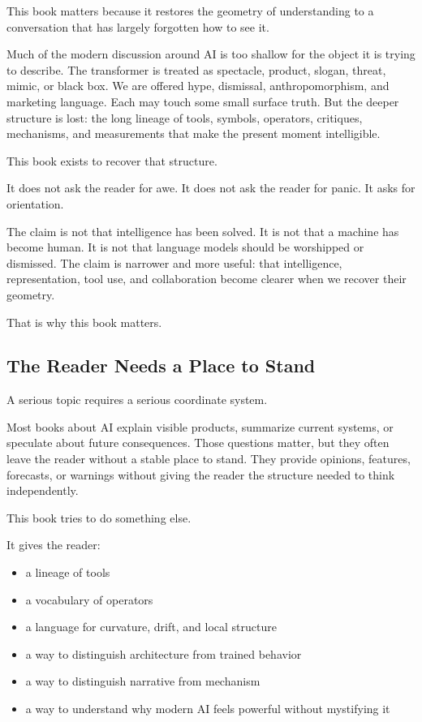 \documentclass[
]{article}
\providecommand{\tightlist}{%
  \setlength{\itemsep}{0pt}\setlength{\parskip}{0pt}}
\begin{document}
This book matters because it restores the geometry of understanding to a
conversation that has largely forgotten how to see it.

Much of the modern discussion around AI is too shallow for the object it
is trying to describe. The transformer is treated as spectacle, product,
slogan, threat, mimic, or black box. We are offered hype, dismissal,
anthropomorphism, and marketing language. Each may touch some small
surface truth. But the deeper structure is lost: the long lineage of
tools, symbols, operators, critiques, mechanisms, and measurements that
make the present moment intelligible.

This book exists to recover that structure.

It does not ask the reader for awe. It does not ask the reader for
panic. It asks for orientation.

The claim is not that intelligence has been solved. It is not that a
machine has become human. It is not that language models should be
worshipped or dismissed. The claim is narrower and more useful: that
intelligence, representation, tool use, and collaboration become clearer
when we recover their geometry.

That is why this book matters.

\hypertarget{the-reader-needs-a-place-to-stand}{%
\subsection{The Reader Needs a Place to
Stand}\label{the-reader-needs-a-place-to-stand}}

A serious topic requires a serious coordinate system.

Most books about AI explain visible products, summarize current systems,
or speculate about future consequences. Those questions matter, but they
often leave the reader without a stable place to stand. They provide
opinions, features, forecasts, or warnings without giving the reader the
structure needed to think independently.

This book tries to do something else.

It gives the reader:

\begin{itemize}
\tightlist
\item
  a lineage of tools
\item
  a vocabulary of operators
\item
  a language for curvature, drift, and local structure
\item
  a way to distinguish architecture from trained behavior
\item
  a way to distinguish narrative from mechanism
\item
  a way to understand why modern AI feels powerful without mystifying it
\end{itemize}
\end{document}

